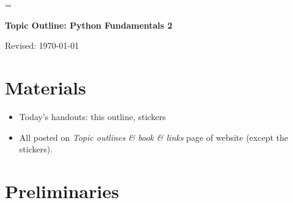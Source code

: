 


\pagestyle{headandfoot}
\runningheadrule
\firstpageheadrule
{}
\runningheader{}{}{}
\runningfooter{}{}{}


\parskip=\bigskipamount

\bigskip\bigskip
\centerline{\Large \bf Topic Outline:  Python Fundamentals 2}
\medskip
\centerline{Revised: \today}


\section*{Materials}

\begin{itemize}
\item  Today's handouts:  this outline, stickers
\item  All posted on {\it Topic outlines \& book \& links\/} page of website (except the stickers).
\end{itemize}


\section*{Preliminaries}

